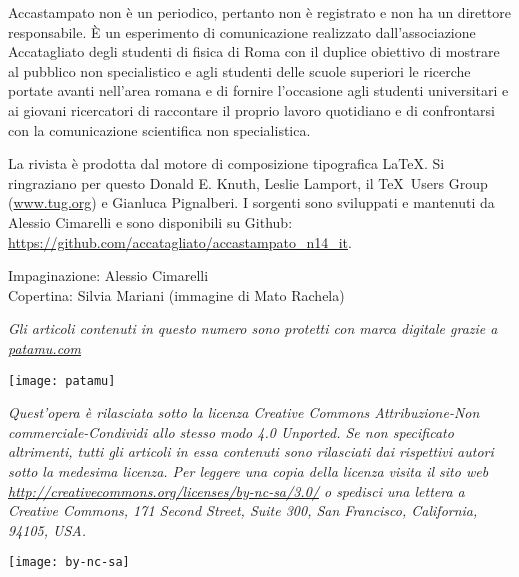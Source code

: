 Accastampato non è un periodico, pertanto non è registrato e non ha un direttore responsabile. 
È un esperimento di comunicazione realizzato dall'associazione Accatagliato degli studenti di fisica 
di Roma con il duplice obiettivo di mostrare al pubblico non specialistico e 
agli studenti delle scuole superiori le ricerche portate avanti nell'area romana e di fornire l'occasione agli studenti 
universitari e ai giovani ricercatori di raccontare il proprio lavoro quotidiano e di confrontarsi 
con la comunicazione scientifica non specialistica.

\bigskip
La rivista è prodotta dal motore di composizione tipografica \LaTeX.
Si ringraziano per questo Donald E. Knuth, Leslie Lamport, 
il \TeX\ Users Group (\url{www.tug.org}) e Gianluca Pignalberi.
I sorgenti sono sviluppati e mantenuti da Alessio Cimarelli e sono disponibili su Github:
\url{https://github.com/accatagliato/accastampato_n14_it}.

\bigskip
Impaginazione: Alessio Cimarelli\\
Copertina: Silvia Mariani (immagine di Mato Rachela)


\vspace{1cm}
\textit{Gli articoli contenuti in questo numero sono protetti con marca digitale grazie a \url{patamu.com}}
\begin{center}\texttt{[image: patamu]}\end{center}

\vspace{1cm}
\textit{Quest'opera è rilasciata sotto la licenza Creative Commons \emph{Attribuzione-Non commerciale-Condividi allo stesso modo}
4.0 Unported. Se non specificato altrimenti, tutti gli articoli in essa contenuti sono rilasciati dai rispettivi autori 
sotto la medesima licenza. Per leggere una copia della licenza visita il sito web
\url{http://creativecommons.org/licenses/by-nc-sa/3.0/} o spedisci una lettera a Creative Commons, 171 Second Street, 
Suite 300, San Francisco, California, 94105, USA.}
\begin{center}\texttt{[image: by-nc-sa]}\end{center}
\vspace{1.5cm}
